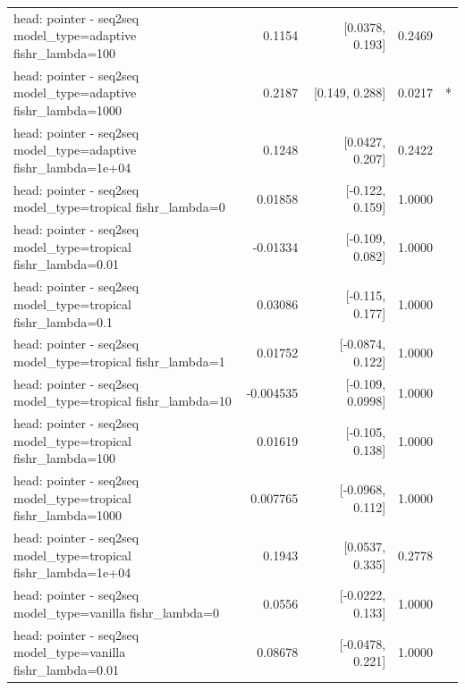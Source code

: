 \documentclass[10pt]{article}
\makeatletter
\newcommand{\stackcell}[1]{\begin{tabular}[t]{@{}l@{}}#1\end{tabular}}
\makeatother
\begin{document}
{\begin{longtable}{lrrrl}
\stackcell{head: pointer - seq2seq\\\footnotesize model\_type=adaptive fishr\_lambda=100 } & 0.1154 & [0.0378, 0.193] & 0.2469 & \\
\stackcell{head: pointer - seq2seq\\\footnotesize model\_type=adaptive fishr\_lambda=1000 } & 0.2187 & [0.149, 0.288] & 0.0217 & *\\
\stackcell{head: pointer - seq2seq\\\footnotesize model\_type=adaptive fishr\_lambda=1e+04 } & 0.1248 & [0.0427, 0.207] & 0.2422 & \\
\stackcell{head: pointer - seq2seq\\\footnotesize model\_type=tropical fishr\_lambda=0 } & 0.01858 & [-0.122, 0.159] & 1.0000 & \\
\stackcell{head: pointer - seq2seq\\\footnotesize model\_type=tropical fishr\_lambda=0.01 } & -0.01334 & [-0.109, 0.082] & 1.0000 & \\
\stackcell{head: pointer - seq2seq\\\footnotesize model\_type=tropical fishr\_lambda=0.1 } & 0.03086 & [-0.115, 0.177] & 1.0000 & \\
\stackcell{head: pointer - seq2seq\\\footnotesize model\_type=tropical fishr\_lambda=1 } & 0.01752 & [-0.0874, 0.122] & 1.0000 & \\
\stackcell{head: pointer - seq2seq\\\footnotesize model\_type=tropical fishr\_lambda=10 } & -0.004535 & [-0.109, 0.0998] & 1.0000 & \\
\stackcell{head: pointer - seq2seq\\\footnotesize model\_type=tropical fishr\_lambda=100 } & 0.01619 & [-0.105, 0.138] & 1.0000 & \\
\stackcell{head: pointer - seq2seq\\\footnotesize model\_type=tropical fishr\_lambda=1000 } & 0.007765 & [-0.0968, 0.112] & 1.0000 & \\
\stackcell{head: pointer - seq2seq\\\footnotesize model\_type=tropical fishr\_lambda=1e+04 } & 0.1943 & [0.0537, 0.335] & 0.2778 & \\
\stackcell{head: pointer - seq2seq\\\footnotesize model\_type=vanilla fishr\_lambda=0 } & 0.0556 & [-0.0222, 0.133] & 1.0000 & \\
\stackcell{head: pointer - seq2seq\\\footnotesize model\_type=vanilla fishr\_lambda=0.01 } & 0.08678 & [-0.0478, 0.221] & 1.0000 & \\

\end{longtable}}
\end{document}
